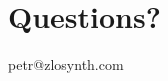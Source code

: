 \documentclass[11pt]{article}
\begin{document}
\noindent
\begin{minipage}[t]{0.3\textwidth}
\section{Questions?}

\begin{center}
petr@zlosynth.com
\end{center}
\end{minipage}
\end{document}
